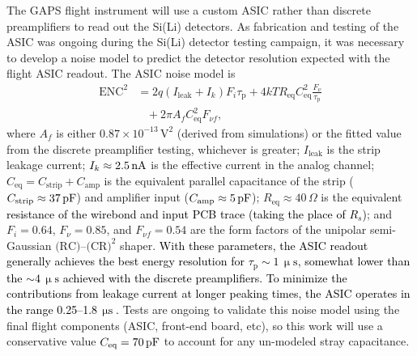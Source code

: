 \documentclass[journal]{IEEEtran}
\newcommand{\red}[1]{\textcolor{black}{#1}}
\begin{document}
%
\par The GAPS flight instrument will use a custom ASIC rather than discrete preamplifiers to read out the Si(Li) detectors. As fabrication and testing of the ASIC was ongoing during the Si(Li) detector testing campaign, it was necessary to develop a noise model to predict the detector resolution expected with the flight ASIC readout. The ASIC noise model is \cite{Manghisoni:2021}
\begin{align}
    \text{ENC}^2 &= 2q(I_\text{leak} + I_{k} )F_i \tau_\text{p} + 4kT R_\text{eq}C_\text{eq}^2\frac{F_\nu}{\tau_\text{p}} \\
    &\;\;\;+2\pi A_f C_\text{eq}^2 F_{\nu f}, \nonumber
\end{align}
where $A_f$ is either $0.87\times 10^{-13}\,\text{V}^2$ (derived from simulations) or the fitted value from the discrete preamplifier testing, whichever is greater; $I_\text{leak}$ is the strip leakage current; $I_k \approx 2.5\text{\,nA}$ is the effective current in the analog channel; ${C_\text{eq} = C_\text{strip} + C_\text{amp}}$ is the equivalent parallel capacitance of the strip (${C_\text{strip} \approx 37\text{\,pF}}$) and amplifier input ($C_\text{amp} \approx 5\text{\,pF}$); $R_\text{eq}\approx 40\,\Omega$ is the equivalent \red{resistance of the wirebond and input PCB trace (taking the place of $R_s$)}; and $F_i = 0.64$, $F_\nu =0.85$, and ${F_{\nu f} = 0.54}$ are the form factors of the unipolar semi-Gaussian $\text{(RC)--(CR)}^2$ shaper. \red{With these parameters, the ASIC readout generally achieves the best energy resolution for $\tau_\text{p}\sim 1\,\upmu\text{s}$, somewhat lower than the ${\sim}4\,\upmu\text{s}$ achieved with the discrete preamplifiers. To minimize the contributions from leakage current at longer peaking times, the ASIC operates in the range 0.25--1.8$\,\upmu\text{s}$.} Tests are ongoing to validate this noise model using the final flight components (ASIC, front-end board, etc), so this work will use a conservative value $C_\text{eq} = 70\text{\,pF}$ to account for any un-modeled stray capacitance.

%
\end{document}
